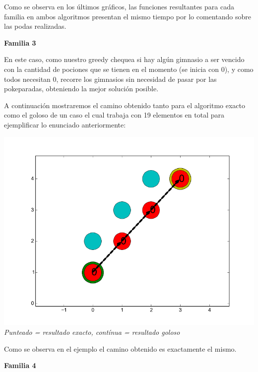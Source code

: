 Como se observa en los \'ultimos gr\'aficos, las funciones resultantes para cada familia en ambos algoritmos presentan el mismo tiempo por lo comentando sobre las podas realizadas.\\

\begin{center}
\textbf{Familia 3}
\end{center}

En este caso, como nuestro greedy chequea si hay alg\'un gimnasio a ser vencido con la cantidad de pociones que se tienen en el momento (se inicia con 0), y como todos necesitan 0, recorre los gimnasios sin necesidad de pasar por las pokeparadas, obteniendo la mejor soluci\'on posible.

A continuaci\'on mostraremos el camino obtenido tanto para el algoritmo exacto como el goloso de un caso el cual trabaja con 19 elementos en total para ejemplificar lo enunciado anteriormente:

   \vspace*{0.3cm} \vspace*{0.3cm}
  \begin{center}
\includegraphics[scale=0.40]{./EJ2/todos0.png}
\\{\textit{Punteado = resultado exacto, contínua = resultado goloso}}
  \end{center}
  \vspace*{0.3cm}

Como se observa en el ejemplo el camino obtenido es exactamente el mismo.


\begin{center}
\textbf{Familia 4}
\end{center}

